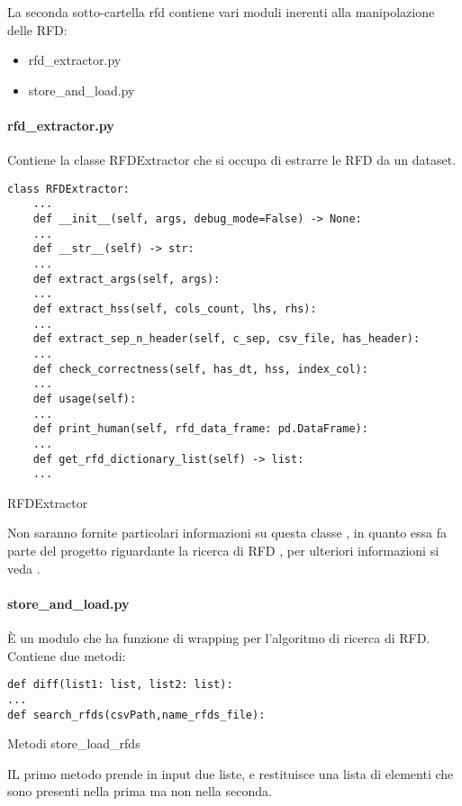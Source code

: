 La seconda sotto-cartella rfd contiene vari moduli inerenti alla manipolazione delle RFD:
\begin{itemize}[noitemsep]
\let\labelitemi\labelitemii
    \item rfd{\_}extractor.py
    \item store{\_}and{\_}load.py
\end{itemize}

\paragraph{rfd{\_}extractor.py}
Contiene la classe RFDExtractor che si occupa di estrarre le RFD da un dataset.
\begin{listing}[H]
\begin{verbatim}
class RFDExtractor:
    ...
    def __init__(self, args, debug_mode=False) -> None:
    ...
    def __str__(self) -> str:
    ...
    def extract_args(self, args):
    ...
    def extract_hss(self, cols_count, lhs, rhs):
    ...
    def extract_sep_n_header(self, c_sep, csv_file, has_header):
    ...
    def check_correctness(self, has_dt, hss, index_col):
    ...
    def usage(self):
    ...
    def print_human(self, rfd_data_frame: pd.DataFrame):
    ...
    def get_rfd_dictionary_list(self) -> list:
    ...
\end{verbatim}
\caption{RFDExtractor}
\label{Code:6}
\end{listing}

Non saranno fornite particolari informazioni su questa classe , in quanto essa fa parte del progetto riguardante la ricerca di RFD , per ulteriori informazioni si veda \cite{tesinaIA}.

\paragraph{store{\_}and{\_}load.py}
È un modulo che ha funzione di wrapping per l'algoritmo di ricerca di RFD.
Contiene due metodi:
\begin{listing}[H]
\begin{verbatim}
def diff(list1: list, list2: list):
...
def search_rfds(csvPath,name_rfds_file):
\end{verbatim}
\caption{Metodi store{\_}load{\_}rfds}
\label{Code:7}
\end{listing}

IL primo metodo  prende in input due liste, e restituisce una lista di elementi che sono presenti nella prima ma non nella seconda.

